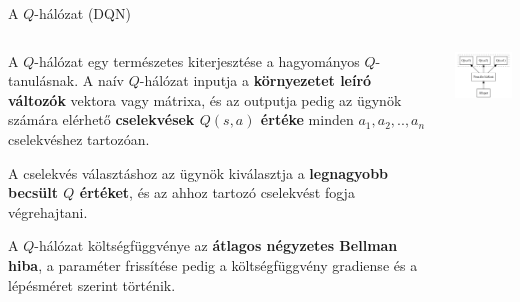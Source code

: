 \documentclass[english, aspectratio=169]{beamer}
\begin{document}
\begin{frame}{A $Q$-hálózat (DQN)}
\begin{columns}
\begin{column}{.6\textwidth}
A $Q$-hálózat egy természetes kiterjesztése a hagyományos $Q$-tanulásnak. A naív $Q$-hálózat inputja a \textbf{környezetet leíró változók} vektora vagy mátrixa, és az outputja pedig az ügynök számára elérhető \textbf{cselekvések $Q(s,a)$ értéke} minden $a_1,a_2,..,a_n$ cselekvéshez tartozóan. \par\smallskip
A cselekvés választáshoz az ügynök kiválasztja a \textbf{legnagyobb becsült $Q$ értéket}, és az ahhoz tartozó cselekvést fogja végrehajtani.\par\smallskip
A $Q$-hálózat költségfüggvénye az \textbf{átlagos négyzetes Bellman hiba}, a paraméter frissítése pedig a költségfüggvény gradiense és a lépésméret szerint történik. 
\end{column}
\begin{column}{.4\textwidth}
\begin{center}
\includegraphics[width=6cm, keepaspectratio]{../../5_ql/doc/graphs/ql_3.png}
\end{center}
\end{column}
\end{columns}
\end{frame}
\end{document}
